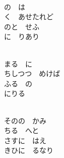 \documentclass[10pt,b5j]{tarticle} %
\begin{document}
\begin{enumerate}
\begin{minipage}[c]{\blocksize}
    \end{minipage}
    \begin{minipage}[c]{\blocksize}
        
        \vspace{\linespace}
        \item~\\
        の　は\\
        く　あせたれど\\
        のと　せふ\\
        に　りあり
        
    \end{minipage}
    \begin{minipage}[c]{\blocksize}
        
        \vspace{\linespace}
        \item~\\
        まる　に\\
        ちしつつ　めけば\\
        ふる　の\\
        にりる　
        
    \end{minipage}
    \begin{minipage}[c]{\blocksize}
        
        \vspace{\linespace}
        \item~\\
        そのの　かみ\\
        ちる　へと\\
        さすに　はえ\\
        きひに　るなり
        
    \end{minipage}
    \begin{minipage}[c]{\blocksize}
        

\end{minipage}
\end{enumerate}
\end{document}
